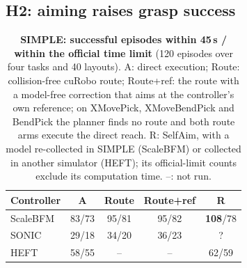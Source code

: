 \documentclass[conference]{IEEEtran}
\newcommand{\Ad}{\textsc{A}}       %
\newcommand{\Rr}{\textsc{R}}       %
\begin{document}
\subsection{H2: aiming raises grasp success}
\begin{table}[t]
\centering
\caption{\textbf{SIMPLE: successful episodes within 45\,s / within the official time limit} (120 episodes over four tasks and 40 layouts). \Ad: direct execution; Route: collision-free cuRobo route; Route+ref: the route with a model-free correction that aims at the controller's own reference; on XMovePick, XMoveBendPick and BendPick the planner finds no route and both route arms execute the direct reach. \Rr: SelfAim, with a model re-collected in SIMPLE (ScaleBFM) or collected in another simulator (HEFT); its official-limit counts exclude its computation time. --: not run.}
\label{tab:simple}
\begin{tabular}{lcccc}
\toprule
Controller & \Ad & Route & Route+ref & \Rr \\
\midrule
ScaleBFM & 83/73 & 95/81 & 95/82 & \textbf{108}/78 \\
SONIC    & 29/18 & 34/20 & 36/23 & {\color{red}?} \\
HEFT     & 58/55 & --    & --    & 62/59 \\
\bottomrule
\end{tabular}
\end{table}
\end{document}
